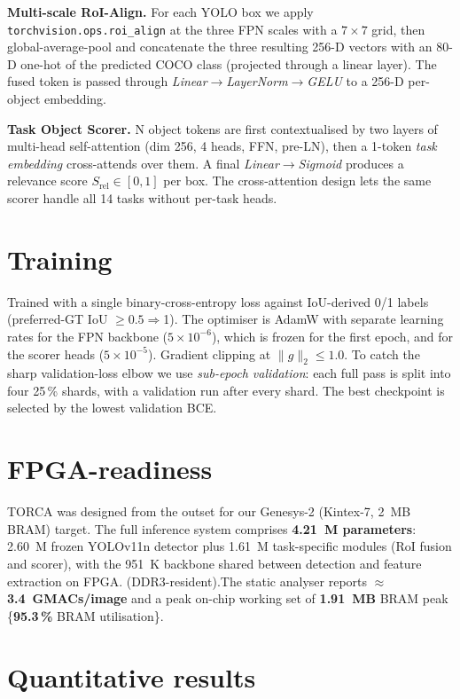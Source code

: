 \documentclass[10pt,a4paper,twocolumn]{article}
\begin{document}
\textbf{Multi-scale RoI-Align.} For each YOLO box we apply
\texttt{torchvision.ops.roi\_align} at the three FPN scales with a
$7{\times}7$ grid, then global-average-pool and concatenate the three
resulting 256-D vectors with an 80-D one-hot of the predicted COCO class
(projected through a linear layer). The fused token is passed through
\textit{Linear$\to$LayerNorm$\to$GELU} to a 256-D per-object embedding.

\textbf{Task Object Scorer.} N object tokens are first contextualised by
two layers of multi-head self-attention (dim 256, 4 heads, FFN, pre-LN), then
a 1-token \emph{task embedding} cross-attends over them. A final
\textit{Linear$\to$Sigmoid} produces a relevance score
$S_{\text{rel}}\in[0,1]$ per box. The cross-attention design lets the same
scorer handle all 14 tasks without per-task heads.

\section{Training}
Trained with a single binary-cross-entropy loss against IoU-derived 0/1
labels (preferred-GT IoU $\geq 0.5 \Rightarrow $1). The optimiser is AdamW
with separate learning rates for the FPN backbone ($5{\times}10^{-6}$),
which is frozen for the first epoch, and for the scorer heads
($5{\times}10^{-5}$). Gradient clipping at $\|g\|_2{\leq}1.0$. To catch the
sharp validation-loss elbow we use \emph{sub-epoch validation}: each full
pass is split into four 25\,\% shards, with a validation run after every
shard. The best checkpoint is selected by the lowest validation BCE.

\section{FPGA-readiness}
TORCA was designed from the outset for our Genesys-2 (Kintex-7, 2~MB BRAM)
target. The full inference system comprises \textbf{4.21~M parameters}:
2.60~M frozen YOLOv11n detector plus 1.61~M task-specific modules (RoI
fusion and scorer), with the 951~K backbone shared between detection and
feature extraction on FPGA.
(DDR3-resident).The static analyser reports \textbf{$\approx$3.4~GMACs/image}
and a peak on-chip working set of \textbf{1.91~MB} BRAM peak \{\textbf{95.3\,\%} BRAM utilisation\}.

\section{Quantitative results}
\end{document}
